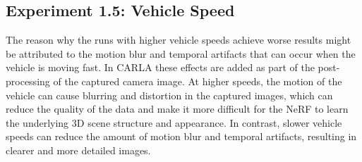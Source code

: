 \begin{comment}
The qualitative assessment shows clear evidence of higher resolution images leading to higher fidelity renders, although the metrics suggest otherwise. When using lower-resolution images, the metrics may become less sensitive because they are less affected by small differences between the synthesized and ground-truth images. This is because lower-resolution images have fewer pixels, which can make the metrics less precise in measuring the perceptual similarity between the images. However, using lower-resolution images can also lead to a loss of detail and fidelity in the synthesized images. When comparing low-resolution images with high-resolution images, these metrics may become less effective because the high-resolution images are more sensitive to small differences between the synthesized and ground-truth images. In other words, the NeRF may generate high-quality images that are perceptually similar to the ground-truth images, but small differences in the pixel values or noise can cause a significant decrease in the metric scores.

The chosen resolution of $400 \times 300$ aligns well with the chosen number of frames from the previous experiment. With 2 ticks per image, $\sim615$ images for the baseline, we have $\sim73$ million pixels. The training will cover about 84\% of the input pixels.

This might be a special case for synthetic data where we have perfect camera poses. With higher-resolution images, the requirement for accurate camera poses increases as the camera poses have to be aligned pixel perfect with the image.
\end{comment}












\subsection{Experiment 1.5: Vehicle Speed}
The reason why the runs with higher vehicle speeds achieve worse results might be attributed to the motion blur and temporal artifacts that can occur when the vehicle is moving fast. In CARLA these effects are added as part of the post-processing of the captured camera image. At higher speeds, the motion of the vehicle can cause blurring and distortion in the captured images, which can reduce the quality of the data and make it more difficult for the NeRF to learn the underlying 3D scene structure and appearance. In contrast, slower vehicle speeds can reduce the amount of motion blur and temporal artifacts, resulting in clearer and more detailed images. 

